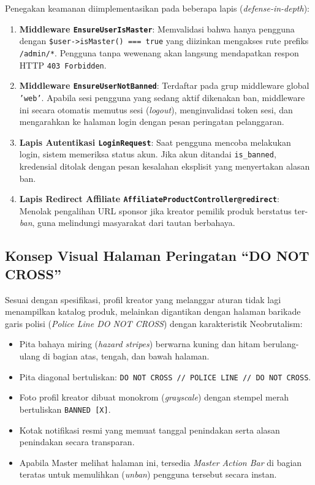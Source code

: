 \documentclass[12pt,a4paper]{article}
\begin{document}
Penegakan keamanan diimplementasikan pada beberapa lapis (\textit{defense-in-depth}):
\begin{enumerate}
    \item \textbf{Middleware \texttt{EnsureUserIsMaster}}: Memvalidasi bahwa hanya pengguna dengan \texttt{\$user->isMaster() === true} yang diizinkan mengakses rute prefiks \texttt{/admin/*}. Pengguna tanpa wewenang akan langsung mendapatkan respon HTTP \texttt{403 Forbidden}.
    \item \textbf{Middleware \texttt{EnsureUserNotBanned}}: Terdaftar pada grup middleware global \texttt{'web'}. Apabila sesi pengguna yang sedang aktif dikenakan ban, middleware ini secara otomatis memutus sesi (\textit{logout}), menginvalidasi token sesi, dan mengarahkan ke halaman login dengan pesan peringatan pelanggaran.
    \item \textbf{Lapis Autentikasi \texttt{LoginRequest}}: Saat pengguna mencoba melakukan login, sistem memeriksa status akun. Jika akun ditandai \texttt{is\_banned}, kredensial ditolak dengan pesan kesalahan eksplisit yang menyertakan alasan ban.
    \item \textbf{Lapis Redirect Affiliate \texttt{AffiliateProductController@redirect}}: Menolak pengalihan URL sponsor jika kreator pemilik produk berstatus ter-\textit{ban}, guna melindungi masyarakat dari tautan berbahaya.
\end{enumerate}

\subsection{Konsep Visual Halaman Peringatan ``DO NOT CROSS''}
Sesuai dengan spesifikasi, profil kreator yang melanggar aturan tidak lagi menampilkan katalog produk, melainkan digantikan dengan halaman barikade garis polisi (\textit{Police Line DO NOT CROSS}) dengan karakteristik Neobrutalism:
\begin{itemize}[noitemsep]
    \item Pita bahaya miring (\textit{hazard stripes}) berwarna kuning dan hitam berulang-ulang di bagian atas, tengah, dan bawah halaman.
    \item Pita diagonal bertuliskan: \texttt{DO NOT CROSS // POLICE LINE // DO NOT CROSS}.
    \item Foto profil kreator dibuat monokrom (\textit{grayscale}) dengan stempel merah bertuliskan \texttt{BANNED [X]}.
    \item Kotak notifikasi resmi yang memuat tanggal penindakan serta alasan penindakan secara transparan.
    \item Apabila Master melihat halaman ini, tersedia \textit{Master Action Bar} di bagian teratas untuk memulihkan (\textit{unban}) pengguna tersebut secara instan.
\end{itemize}
\end{document}
